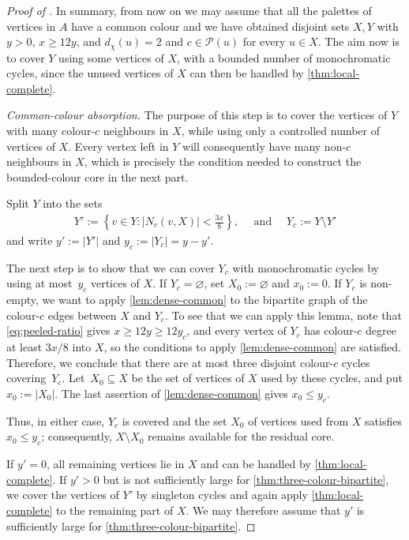 \documentclass[a4paper,12pt,reqno]{amsart}
\newcommand{\cP}{\mathcal P}
\newcommand{\dd}{d_{\chi}}
\begin{document}
\begin{proof}[Proof of ]
In summary, from now on we may assume that all the palettes of vertices in $A$
have a common colour and we have obtained disjoint sets $X,Y$ with $y>0$,
$x\ge12y$, and $\dd(u)=2$ and $c\in\cP(u)$ for every $u\in X$. The aim now is to
cover $Y$ using some vertices of $X$, with a bounded number of monochromatic
cycles, since the unused vertices of $X$ can then be handled by
\cref{thm:local-complete}.

\medskip
\noindent\emph{Common-colour absorption.} The purpose of this step is to cover
the vertices of $Y$ with many colour-$c$ neighbours in $X$, while using
only a controlled number of vertices of $X$. Every vertex left in $Y$ will
consequently have many non-$c$ neighbours in $X$, which is precisely the
condition needed to construct the bounded-colour core in the next part.

Split $Y$ into the sets
\begin{align*}
  Y':=\left\{v\in Y\colon|N_c(v,X)|<\frac{3x}{8}\right\},\quad\text{ and }\quad Y_c:=Y\setminus Y'
\end{align*}
and write $y':=|Y'|$ and $y_c:=|Y_c|=y-y'$.

The next step is to show that we can cover $Y_c$ with monochromatic cycles by
using at most~$y_c$ vertices of $X$. If $Y_c=\varnothing$, set
$X_0:=\varnothing$ and $x_0:=0$. If $Y_c$ is non-empty, we want to apply
\cref{lem:dense-common} to the bipartite graph of the colour-$c$ edges between
$X$ and $Y_c$. To see that we can apply this lemma, note that
\eqref{eq:peeled-ratio} gives $x\ge12y\ge12y_c$, and every vertex of $Y_c$ has
colour-$c$ degree at least $3x/8$ into $X$, so the conditions to apply
\cref{lem:dense-common} are satisfied. Therefore, we conclude that there are at
most three disjoint colour-$c$ cycles covering~$Y_c$. Let~$X_0\subseteq X$ be
the set of vertices of $X$ used by these cycles, and put $x_0:=|X_0|$. The last
assertion of \cref{lem:dense-common} gives $x_0\le y_c$.

Thus, in either case, $Y_c$ is covered and the set $X_0$ of vertices used from
$X$ satisfies $x_0\le y_c$; consequently, $X\setminus X_0$ remains available
for the residual core.

If $y'=0$, all remaining vertices lie in $X$ and can be handled by
\cref{thm:local-complete}. If $y'>0$ but is not sufficiently large for
\cref{thm:three-colour-bipartite}, we cover the vertices of $Y'$ by singleton
cycles and again apply \cref{thm:local-complete} to the remaining part of $X$.
We may therefore assume that $y'$ is sufficiently large for
\cref{thm:three-colour-bipartite}.


\end{proof}
\end{document}
